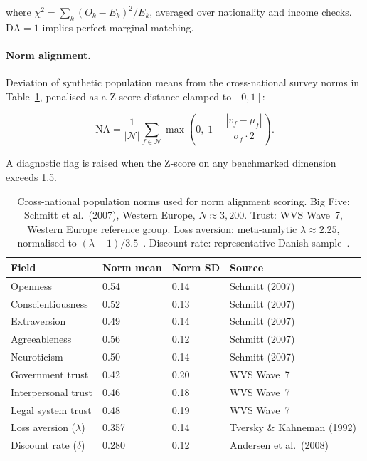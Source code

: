 \documentclass[sustainability,article,submit,pdftex,moreauthors]{Definitions/mdpi}
\begin{document}
where $\chi^2 = \sum_k (O_k - E_k)^2 / E_k$, averaged over nationality
and income checks. $\text{DA} = 1$ implies perfect marginal matching.

\paragraph{Norm alignment.}
Deviation of synthetic population means from the cross-national survey
norms in Table~\ref{tab:norms}, penalised as a Z-score distance
clamped to $[0,1]$:

\begin{linenomath}
\begin{equation}
  \text{NA} = \frac{1}{|\mathcal{N}|}\sum_{f \in \mathcal{N}}
              \max\!\left(0,\; 1 - \frac{|\bar{v}_f - \mu_f|}{\sigma_f \cdot 2}\right).
  \label{eq:norm_align}
\end{equation}
\end{linenomath}

A diagnostic flag is raised when the Z-score on any benchmarked dimension
exceeds 1.5.

\begin{table}[H]
\caption{Cross-national population norms used for norm alignment scoring.
Big Five: Schmitt et al.\ (2007), Western Europe, $N \approx 3{,}200$.
Trust: WVS Wave~7, Western Europe reference group.
Loss aversion: meta-analytic $\lambda \approx 2.25$, normalised to
$(\lambda - 1)/3.5$~\cite{tversky1992advances}.
Discount rate: representative Danish sample~\cite{andersen2008eliciting}.}
\label{tab:norms}
\begin{tabularx}{\textwidth}{lXXX}
\toprule
\textbf{Field} & \textbf{Norm mean} & \textbf{Norm SD} & \textbf{Source} \\
\midrule
Openness           & 0.54 & 0.14 & Schmitt (2007) \\
Conscientiousness  & 0.52 & 0.13 & Schmitt (2007) \\
Extraversion       & 0.49 & 0.14 & Schmitt (2007) \\
Agreeableness      & 0.56 & 0.12 & Schmitt (2007) \\
Neuroticism        & 0.50 & 0.14 & Schmitt (2007) \\
Government trust   & 0.42 & 0.20 & WVS Wave~7 \\
Interpersonal trust& 0.46 & 0.18 & WVS Wave~7 \\
Legal system trust & 0.48 & 0.19 & WVS Wave~7 \\
Loss aversion ($\lambda$) & 0.357 & 0.14 & Tversky \& Kahneman (1992) \\
Discount rate ($\delta$)  & 0.280 & 0.12 & Andersen et al.\ (2008) \\
\bottomrule
\end{tabularx}
\end{table}
\end{document}
